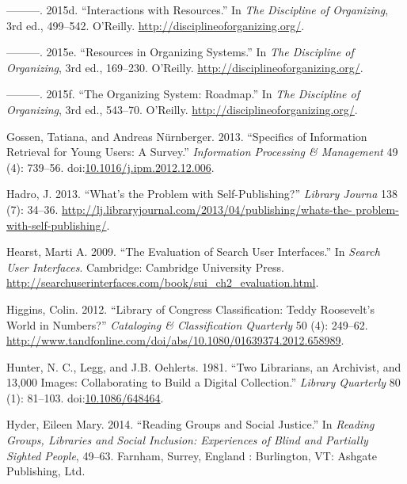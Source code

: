 \documentclass[]{article}
\begin{document}
\hypertarget{ref-glushkoux5finteractionsux5f2015}{}
---------. 2015d. ``Interactions with Resources.'' In \emph{The
Discipline of Organizing}, 3rd ed., 499--542. O'Reilly.
\url{http://disciplineoforganizing.org/}.

\hypertarget{ref-glushkoux5fresourcesux5f2015}{}
---------. 2015e. ``Resources in Organizing Systems.'' In \emph{The
Discipline of Organizing}, 3rd ed., 169--230. O'Reilly.
\url{http://disciplineoforganizing.org/}.

\hypertarget{ref-glushkoux5forganizingux5f2015}{}
---------. 2015f. ``The Organizing System: Roadmap.'' In \emph{The
Discipline of Organizing}, 3rd ed., 543--70. O'Reilly.
\url{http://disciplineoforganizing.org/}.

\hypertarget{ref-gossenux5fspecificsux5f2013}{}
Gossen, Tatiana, and Andreas Nürnberger. 2013. ``Specifics of
Information Retrieval for Young Users: A Survey.'' \emph{Information
Processing \& Management} 49 (4): 739--56.
doi:\href{https://doi.org/10.1016/j.ipm.2012.12.006}{10.1016/j.ipm.2012.12.006}.

\hypertarget{ref-hadroux5fwhatsux5f2013}{}
Hadro, J. 2013. ``What's the Problem with Self-Publishing?''
\emph{Library Journa} 138 (7): 34--36.
\href{http://lj.libraryjournal.com/2013/04/publishing/whats-the-\%20problem-with-self-publishing/}{http://lj.libraryjournal.com/2013/04/publishing/whats-the- problem-with-self-publishing/}.

\hypertarget{ref-hearstux5fevaluationux5f2009}{}
Hearst, Marti A. 2009. ``The Evaluation of Search User Interfaces.'' In
\emph{Search User Interfaces}. Cambridge: Cambridge University Press.
\url{http://searchuserinterfaces.com/book/sui_ch2_evaluation.html}.

\hypertarget{ref-higginsux5flibraryux5f2012}{}
Higgins, Colin. 2012. ``Library of Congress Classification: Teddy
Roosevelt's World in Numbers?'' \emph{Cataloging \& Classification
Quarterly} 50 (4): 249--62.
\url{http://www.tandfonline.com/doi/abs/10.1080/01639374.2012.658989}.

\hypertarget{ref-hunterux5ftwoux5f1981}{}
Hunter, N. C., Legg, and J.B. Oehlerts. 1981. ``Two Librarians, an
Archivist, and 13,000 Images: Collaborating to Build a Digital
Collection.'' \emph{Library Quarterly} 80 (1): 81--103.
doi:\href{https://doi.org/10.1086/648464}{10.1086/648464}.

\hypertarget{ref-hyderux5freadingux5f2014}{}
Hyder, Eileen Mary. 2014. ``Reading Groups and Social Justice.'' In
\emph{Reading Groups, Libraries and Social Inclusion: Experiences of
Blind and Partially Sighted People}, 49--63. Farnham, Surrey, England :
Burlington, VT: Ashgate Publishing, Ltd.
\end{document}
